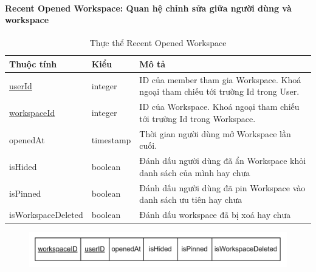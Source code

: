\paragraph{Recent Opened Workspace: Quan hệ chỉnh sửa giữa người dùng và workspace}
\begin{center}
\begin{table}[!h]
        \begin{tabular}{ |p{3cm} |p{2cm} |p{9cm}|} 
                \hline
                   Thuộc tính & Kiểu & Mô tả \\ [0.5ex] 
                \hline
                \underline{userId} & integer & ID của member tham gia Workspace. Khoá ngoại tham chiếu tới trường Id trong User. \\ 
                \hline
                \underline{workspaceId} & integer & ID của Workspace. Khoá ngoại tham chiếu tới trường Id trong Workspace. \\
                \hline
                openedAt & timestamp & Thời gian người dùng mở Workspace lần cuối.\\
                \hline
                isHided & boolean & Đánh dấu người dùng đã ẩn Workspace khỏi danh sách của mình hay chưa \\
                \hline
                isPinned & boolean & Đánh dấu người dùng đã pin Workspace vào danh sách ưu tiên hay chưa \\
                \hline
                isWorkspaceDeleted & boolean & Đánh dấu workspace đã bị xoá hay chưa \\
                \hline
               \end{tabular}
                        \caption{Thực thể Recent Opened Workspace}
\end{table}
\end{center}
\begin{figure}[H]
        \centering
        \includegraphics[width=\textwidth]{Content/Phân tích và thiết kế hệ thống/images/ERD_mapping/recent_opened_workspace_mapping.png}
        \label{fig:Thực thể Recent Opened Workspace}
\end{figure}

